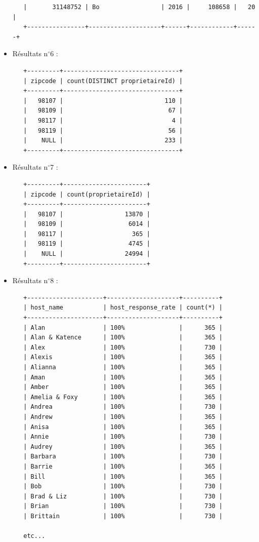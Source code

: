 \documentclass[11pt, a4paper]{article}
\begin{document}
\begin{itemize}[label=\textbullet]
\begin{lstlisting}
   |       31148752 | Bo                 | 2016 |     108658 |   20 |
   +----------------+--------------------+------+------------+------+
   \end{lstlisting}
   \item Résultats n$^\circ$6 :
   \begin{lstlisting}
   +---------+--------------------------------+
   | zipcode | count(DISTINCT proprietaireId) |
   +---------+--------------------------------+
   |   98107 |                            110 |
   |   98109 |                             67 |
   |   98117 |                              4 |
   |   98119 |                             56 |
   |    NULL |                            233 |
   +---------+--------------------------------+
   \end{lstlisting}
   \item Résultats n$^\circ$7 :
   \begin{lstlisting}
   +---------+-----------------------+
   | zipcode | count(proprietaireId) |
   +---------+-----------------------+
   |   98107 |                 13870 |
   |   98109 |                  6014 |
   |   98117 |                   365 |
   |   98119 |                  4745 |
   |    NULL |                 24994 |
   +---------+-----------------------+
   \end{lstlisting}
   \pagebreak
   \item Résultats n$^\circ$8 :
   \begin{lstlisting}
   +---------------------+--------------------+----------+
   | host_name           | host_response_rate | count(*) |
   +---------------------+--------------------+----------+
   | Alan                | 100%               |      365 |
   | Alan & Katence      | 100%               |      365 |
   | Alex                | 100%               |      730 |
   | Alexis              | 100%               |      365 |
   | Alianna             | 100%               |      365 |
   | Aman                | 100%               |      365 |
   | Amber               | 100%               |      365 |
   | Amelia & Foxy       | 100%               |      365 |
   | Andrea              | 100%               |      730 |
   | Andrew              | 100%               |      365 |
   | Anisa               | 100%               |      365 |
   | Annie               | 100%               |      730 |
   | Audrey              | 100%               |      365 |
   | Barbara             | 100%               |      730 |
   | Barrie              | 100%               |      365 |
   | Bill                | 100%               |      365 |
   | Bob                 | 100%               |      730 |
   | Brad & Liz          | 100%               |      730 |
   | Brian               | 100%               |      730 |
   | Brittain            | 100%               |      730 |

   etc...
   \end{lstlisting}
\end{itemize}
\end{document}

